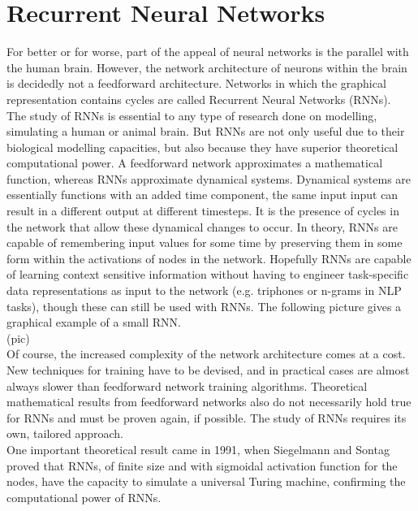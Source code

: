\documentclass[12pt,oneside]{CUNY_CS_PhD}
\begin{document}
\section{Recurrent Neural Networks}
For better or for worse, part of the appeal of neural networks is the parallel with the human brain. However, the network architecture of neurons within the brain is decidedly not a feedforward architecture. Networks in which the graphical representation contains cycles are called Recurrent Neural Networks (RNNs).\\
The study of RNNs is essential to any type of research done on modelling, simulating a human or animal brain. But RNNs are not only useful due to their biological modelling capacities, but also because they have superior theoretical computational power. A feedforward network approximates a mathematical function, whereas RNNs approximate dynamical systems. Dynamical systems are essentially functions with an added time component, the same input input can result in a different output at different timesteps. It is the presence of cycles in the network that allow these dynamical changes to occur. In theory, RNNs are capable of remembering input values for some time by preserving them in some form within the activations of nodes in the network. Hopefully RNNs are capable of learning context sensitive information without having to engineer task-specific data representations as input to the network (e.g. triphones or n-grams in NLP tasks), though these can still be used with RNNs. The following picture gives a graphical example of a small RNN.\\
(pic)\\
Of course, the increased complexity of the network architecture comes at a cost. New techniques for training have to be devised, and in practical cases are almost always slower than feedforward network training algorithms. Theoretical mathematical results from feedforward networks also do not necessarily hold true for RNNs and must be proven again, if possible. The study of RNNs requires its own, tailored approach.\\
One important theoretical result came in 1991, when Siegelmann and Sontag proved that RNNs, of finite size and with sigmoidal activation function for the nodes, have the capacity to simulate a universal Turing machine, confirming the computational power of RNNs.
\end{document}
